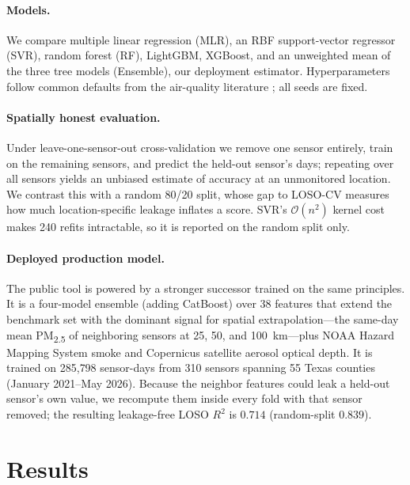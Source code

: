 \documentclass{article}
\begin{document}
\paragraph{Models.} We compare multiple linear regression (MLR), an RBF support-vector regressor (SVR), random forest (RF), LightGBM, XGBoost, and an unweighted mean of the three tree models (Ensemble), our deployment estimator. Hyperparameters follow common defaults from the air-quality literature \citep{ghahremanloo2021, zhang2024unmasking}; all seeds are fixed.

\paragraph{Spatially honest evaluation.} Under leave-one-sensor-out cross-validation we remove one sensor entirely, train on the remaining sensors, and predict the held-out sensor's days; repeating over all sensors yields an unbiased estimate of accuracy at an unmonitored location. We contrast this with a random 80/20 split, whose gap to LOSO-CV measures how much location-specific leakage inflates a score. SVR's $\mathcal{O}(n^2)$ kernel cost makes 240 refits intractable, so it is reported on the random split only.

\paragraph{Deployed production model.} The public tool is powered by a stronger successor trained on the same principles. It is a four-model ensemble (adding CatBoost) over 38 features that extend the benchmark set with the dominant signal for spatial extrapolation---the same-day mean PM\textsubscript{2.5} of neighboring sensors at 25, 50, and 100~km---plus NOAA Hazard Mapping System smoke and Copernicus satellite aerosol optical depth. It is trained on 285{,}798 sensor-days from 310 sensors spanning 55 Texas counties (January 2021--May 2026). Because the neighbor features could leak a held-out sensor's own value, we recompute them inside every fold with that sensor removed; the resulting leakage-free LOSO $R^2$ is $0.714$ (random-split $0.839$).

\section{Results}
\label{sec:results}
\end{document}
